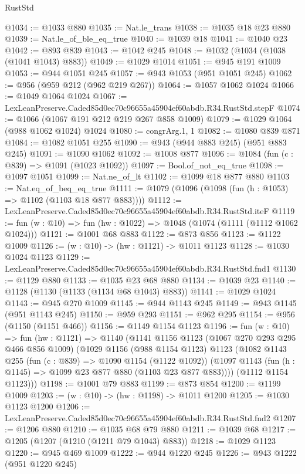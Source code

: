 \begin{lexlean}{RustStd}
\begin{coremodule}
@1034 := @1033 @880
@1035 := Nat.le_trans
@1038 := @1035 @18 @23 @880
@1039 := Nat.le_of_ble_eq_true
@1040 := @1039 @18
@1041 := @1040 @23
@1042 := @893 @839
@1043 := @1042 @245
@1048 := @1032 (@1034 (@1038 (@1041 @1043) @883))
@1049 := @1029 @1014
@1051 := @945 @191 @1009
@1053 := @944 @1051 @245
@1057 := @943 @1053 (@951 @1051 @245)
@1062 := @956 (@959 @212 (@962 @219 @267))
@1064 := @1057 @1062 @1024
@1066 := @1049 @1064 @1024
@1067 := LexLeanPreserve.Caded85d0ec70c96655a45904ef60abdb.R34.RustStd.stepF
@1074 := @1066 (@1067 @191 @212 @219 @267 @858 @1009)
@1079 := @1029 @1064 (@988 @1062 @1024) @1024
@1080 := congrArg.{1, 1}
@1082 := @1080 @839 @871
@1084 := @1082 @1051 @255
@1090 := @943 (@944 @883 @245) (@951 @883 @245)
@1091 := @1090 @1062
@1092 := @1008 @877
@1096 := @1084 (fun (c : @839) => @1091 (@1023 @1092))
@1097 := Bool.of_not_eq_true
@1098 := @1097 @1051
@1099 := Nat.ne_of_lt
@1102 := @1099 @18 @877 @880
@1103 := Nat.eq_of_beq_eq_true
@1111 := @1079 (@1096 (@1098 (fun (h : @1053) => @1102 (@1103 @18 @877 @883))))
@1112 := LexLeanPreserve.Caded85d0ec70c96655a45904ef60abdb.R34.RustStd.iteF
@1119 := fun (w : @10) => fun (hw : @1022) => @1048 (@1074 (@1111 (@1112 @1062 @1024)))
@1121 := @1001 @68 @883
@1122 := @873 @856
@1123 := @1122 @1009
@1126 := (w : @10) -> (hw : @1121) -> @1011 @1123
@1128 := @1030 @1024 @1123
@1129 := LexLeanPreserve.Caded85d0ec70c96655a45904ef60abdb.R34.RustStd.fnd1
@1130 := @1129 @880
@1133 := @1035 @23 @68 @880
@1134 := @1039 @23
@1140 := @1128 (@1130 (@1133 (@1134 @68 @1043) @883))
@1141 := @1029 @1024
@1143 := @945 @270 @1009
@1145 := @944 @1143 @245
@1149 := @943 @1145 (@951 @1143 @245)
@1150 := @959 @293
@1151 := @962 @295
@1154 := @956 (@1150 (@1151 @466))
@1156 := @1149 @1154 @1123
@1196 := fun (w : @10) =>
  fun (hw : @1121) =>
  @1140
    (@1141
      @1156
      @1123
      (@1067 @270 @293 @295 @466 @856 @1009)
      (@1029
        @1156
        (@988 @1154 @1123)
        @1123
        (@1082
          @1143
          @255
          (fun (c : @839) => @1090 @1154 (@1122 @1092))
          (@1097 @1143 (fun (h : @1145) => @1099 @23 @877 @880 (@1103 @23 @877 @883))))
        (@1112 @1154 @1123)))
@1198 := @1001 @79 @883
@1199 := @873 @854
@1200 := @1199 @1009
@1203 := (w : @10) -> (hw : @1198) -> @1011 @1200
@1205 := @1030 @1123 @1200
@1206 := LexLeanPreserve.Caded85d0ec70c96655a45904ef60abdb.R34.RustStd.fnd2
@1207 := @1206 @880
@1210 := @1035 @68 @79 @880
@1211 := @1039 @68
@1217 := @1205 (@1207 (@1210 (@1211 @79 @1043) @883))
@1218 := @1029 @1123
@1220 := @945 @469 @1009
@1222 := @944 @1220 @245
@1226 := @943 @1222 (@951 @1220 @245)

\end{coremodule}
\end{lexlean}
